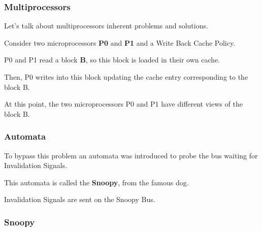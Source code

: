 
\begin{frame}
  \frametitle{Multiprocessors}

  Let's talk about multiprocessors inherent problems and solutions.

  \-

  Consider two microprocessors \textbf{P0} and \textbf{P1} and a Write
  Back Cache Policy.

  \-

  P0 and P1 read a block \textbf{B}, so this block is loaded in their
  own cache.

  \-

  Then, P0 writes into this block updating the cache entry corresponding to
  the block B.

  \-

  At this point, the two microprocessors P0 and P1 have different
  views of the block B.
\end{frame}


\begin{frame}
  \frametitle{Automata}

  To bypass this problem an automata was introduced to probe the bus
  waiting for Invalidation Signals.

  \-

  This automata is called the \textbf{Snoopy}, from the famous dog.

  \-

  Invalidation Signals are sent on the Snoopy Bus.
\end{frame}


\begin{frame}
  \frametitle{Snoopy}

  \begin{center}
  \end{center}
\end{frame}


